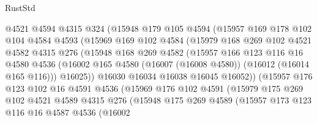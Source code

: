 \begin{lexlean}{RustStd}
\begin{coremodule}
                  @4521
                  @4594
                  @4315
                  @324
                  (@15948
                    @179
                    @105
                    @4594
                    (@15957
                      @169
                      @178
                      @102
                      @104
                      @4584
                      @4593
                      (@15969
                        @169
                        @102
                        @4584
                        (@15979
                          @168
                          @269
                          @102
                          @4521
                          @4582
                          @4315
                          @276
                          (@15948
                            @168
                            @269
                            @4582
                            (@15957
                              @166
                              @123
                              @116
                              @16
                              @4580
                              @4536
                              (@16002
                                @165
                                @4580
                                (@16007 (@16008 @4580))
                                (@16012 (@16014 @165 @116)))
                              @16025))
                          @16030
                          @16034
                          @16038
                          @16045
                          @16052))
                      (@15957
                        @176
                        @123
                        @102
                        @16
                        @4591
                        @4536
                        (@15969
                          @176
                          @102
                          @4591
                          (@15979
                            @175
                            @269
                            @102
                            @4521
                            @4589
                            @4315
                            @276
                            (@15948
                              @175
                              @269
                              @4589
                              (@15957
                                @173
                                @123
                                @116
                                @16
                                @4587
                                @4536
                                (@16002

\end{coremodule}
\end{lexlean}

